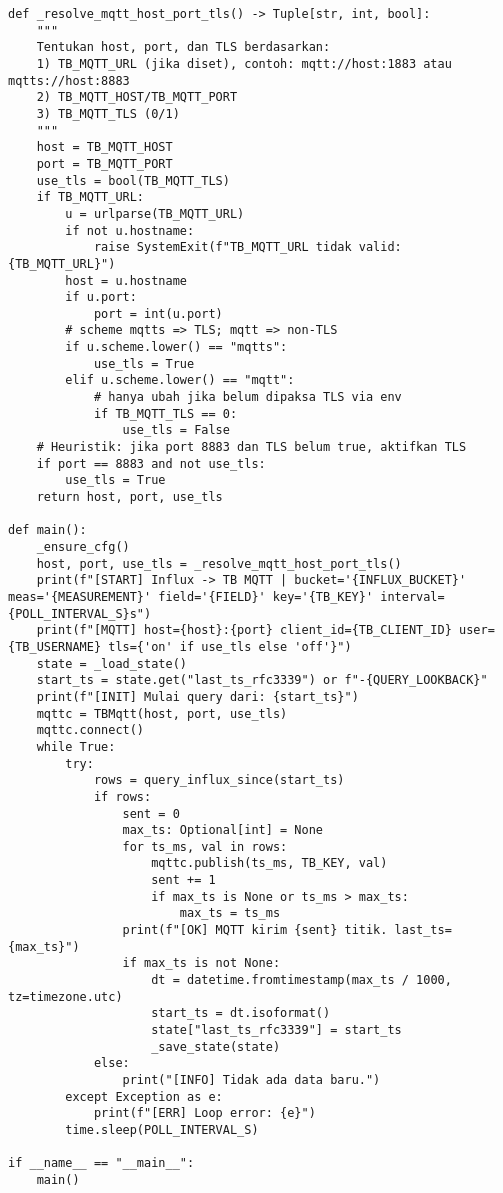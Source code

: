\documentclass[a4paper, 12pt]{article}
\begin{document}
\begin{lstlisting}[style=pythonstyle, caption={InfluxDB DWSIM dan Kirim ke Thingsboard (python)}]
def _resolve_mqtt_host_port_tls() -> Tuple[str, int, bool]:
    """
    Tentukan host, port, dan TLS berdasarkan:
    1) TB_MQTT_URL (jika diset), contoh: mqtt://host:1883 atau mqtts://host:8883
    2) TB_MQTT_HOST/TB_MQTT_PORT
    3) TB_MQTT_TLS (0/1)
    """
    host = TB_MQTT_HOST
    port = TB_MQTT_PORT
    use_tls = bool(TB_MQTT_TLS)
    if TB_MQTT_URL:
        u = urlparse(TB_MQTT_URL)
        if not u.hostname:
            raise SystemExit(f"TB_MQTT_URL tidak valid: {TB_MQTT_URL}")
        host = u.hostname
        if u.port:
            port = int(u.port)
        # scheme mqtts => TLS; mqtt => non-TLS
        if u.scheme.lower() == "mqtts":
            use_tls = True
        elif u.scheme.lower() == "mqtt":
            # hanya ubah jika belum dipaksa TLS via env
            if TB_MQTT_TLS == 0:
                use_tls = False
    # Heuristik: jika port 8883 dan TLS belum true, aktifkan TLS
    if port == 8883 and not use_tls:
        use_tls = True
    return host, port, use_tls

def main():
    _ensure_cfg()
    host, port, use_tls = _resolve_mqtt_host_port_tls()
    print(f"[START] Influx -> TB MQTT | bucket='{INFLUX_BUCKET}' meas='{MEASUREMENT}' field='{FIELD}' key='{TB_KEY}' interval={POLL_INTERVAL_S}s")
    print(f"[MQTT] host={host}:{port} client_id={TB_CLIENT_ID} user={TB_USERNAME} tls={'on' if use_tls else 'off'}")
    state = _load_state()
    start_ts = state.get("last_ts_rfc3339") or f"-{QUERY_LOOKBACK}"
    print(f"[INIT] Mulai query dari: {start_ts}")
    mqttc = TBMqtt(host, port, use_tls)
    mqttc.connect()
    while True:
        try:
            rows = query_influx_since(start_ts)
            if rows:
                sent = 0
                max_ts: Optional[int] = None
                for ts_ms, val in rows:
                    mqttc.publish(ts_ms, TB_KEY, val)
                    sent += 1
                    if max_ts is None or ts_ms > max_ts:
                        max_ts = ts_ms
                print(f"[OK] MQTT kirim {sent} titik. last_ts={max_ts}")
                if max_ts is not None:
                    dt = datetime.fromtimestamp(max_ts / 1000, tz=timezone.utc)
                    start_ts = dt.isoformat()
                    state["last_ts_rfc3339"] = start_ts
                    _save_state(state)
            else:
                print("[INFO] Tidak ada data baru.")
        except Exception as e:
            print(f"[ERR] Loop error: {e}")
        time.sleep(POLL_INTERVAL_S)

if __name__ == "__main__":
    main()
\end{lstlisting}
\clearpage
\end{document}
